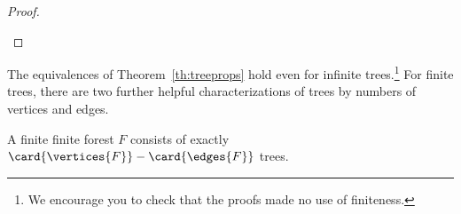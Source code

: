\begin{proof}
\begin{itemize}
\iffalse
  Beginning at $u$, let $x$ be the first vertex where
  the paths diverge, and let $y$ be the next vertex they share.  (For
  example, see Figure~\ref{fig:5L}.)  Then there are two paths from
  $x$ to~$y$ with no common edges, which defines a cycle.  This is a
  contradiction, since trees are acyclic.  Therefore, there is
  exactly one path between every pair of vertices.
\begin{figure}
\graphic{unique-path}
\caption{If there are two paths between $u$ and~$v$, the graph must
  contain a cycle.}
\label{fig:5L}
\end{figure}

\item \eqref{uniquepath}~implies~\eqref{isatree}.  Connectedness is
  immediate from~\eqref{uniquepath}.  If there were a cycle, then
  there are two paths between any two distict vertices on the path,
  contradicting uniqueness.  So the graph must be acyclic.

\item \eqref{maxacyclic}~implies~\eqref{isatree}: Acyclic is immediate
  from~\eqref{maxacyclic}.  If the graph was not connected, the adding
  an edge between any two distinct components cannot create a cycle, so
  the graph must be connected.

\item \eqref{isatree}~implies~\eqref{minconnect}: If an edge of $G$
  was not a cut edge, then by Lemma~\ref{lem:cutiffcycle} it is on a
  cycle, contradicting~\eqref{isatree}.
\fi

\end{itemize}

\end{proof}

The equivalences of Theorem~\ref{th:treeprops} hold even for infinite
trees.\footnote{We encourage you to check that the proofs made no use
  of finiteness.}  For finite trees, there are two further helpful
characterizations of trees by numbers of vertices and edges.

\begin{theorem}\label{th:forestsize}
A finite finite forest $F$ consists of exactly $\card{\vertices{F}} -
\card{\edges{F}}$ trees.
\end{theorem}

